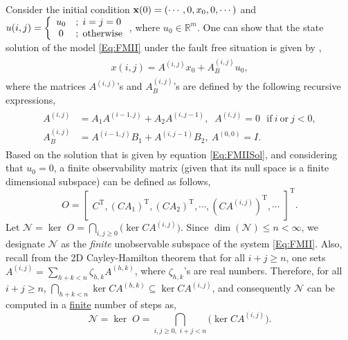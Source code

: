 \documentclass[journal,12pt,draftcls,onecolumn]{IEEEtran}
\newcommand{\tran}{\mathrm{T}}
\newcommand{\ssp}[1]{\mathscr{#1}}      \newcommand{\setssp}[1]{\mathfrak{#1}}   \newcommand{\fld}[1]{\mathbb{#1}}       \newcommand{\op}[1]{\mathcal{#1}}       \newcommand{\sumbanach}[1]{\sum{#1}}
\begin{document}
Consider the initial condition ${\bf x}(0) = (\cdots,0,x_0,0,\cdots)$ and $u(i,j) = \left\{
\begin{array} {c l}
u_0 &;\; i=j=0\\
0 &;\; \mathrm{otherwise}
\end{array}\right.$, where $u_0\in\fld{R}^m$. One can show that the  state solution of the model \eqref{Eq:FMII} under the fault free situation is given by \cite{FMinBook},
\vspace{-1mm}
\begin{eqnarray}\label{Eq:FMIISol}
	\begin{split}
		x(i,j) = A^{(i,j)}x_0 + A^{(i,j)}_B u_0,
	\end{split}
\end{eqnarray}
where the matrices $A^{(i,j)}$'s and $A^{(i,j)}_B$'s are defined by the following recursive  expressions,
\vspace{-2mm}
\begin{eqnarray}\label{Eq: Adef1}
	\begin{split}
		A^{(i,j)} &= A_1 A^{(i-1,j)} + A_2A^{(i,j-1)},\;\; A^{(i,j)} = 0 \ \ \  \mathrm{if} \ i \ \mathrm{or} \ j < 0,\\
		A^{(i,j)}_B &=A^{(i-1,j)}B_1+A^{(i,j-1)}B_2,\ A^{(0,0)} = I.
	\end{split}
\end{eqnarray}
Based on the solution that is given by equation  \eqref{Eq:FMIISol}, and considering that $u_0=0$, a finite observability matrix (given that its null space is a finite dimensional subspace) can be defined as follows,
\begin{equation}\label{Eq:Observ_M}
	O = \begin{bmatrix}C^\tran, (CA_1)^\tran, (CA_2)^\tran, \cdots, (CA^{(i,j)})^\tran, \cdots\end{bmatrix}^\tran.
\end{equation}
Let $\ssp{N} = \ker\;O = \bigcap_{i,j\geq 0} \big(\ker CA^{(i,j)}\big)$. Since $\dim(\ssp{N})\le n<\infty$, we designate $\ssp{N}$ as the \emph{finite} unobservable subspace of the system \eqref{Eq:FMII}.  Also, recall from the 2D Cayley-Hamilton theorem \cite{FMinBook} that for all $i+j\geq n$, one sets $A^{(i,j)}=\sum_{h+k<n}\zeta_{h,k} A^{(h,k)}$, where $\zeta_{h,k}$'s are real numbers. Therefore, for all $i+j\geq n$, $\bigcap_{h+k<n}\ker CA^{(h,k)}\subseteq\ker CA^{(i,j)}$, and consequently $\ssp{N}$ can be computed in a \underline{finite} number of steps as,
\begin{equation}\label{Eq:UnObsSpaceFinite}
	\ssp{N} = \ker\;O = \bigcap_{i,j\geq 0,\;i+j<n} \big(\ker CA^{(i,j)}\big).
\end{equation}
\end{document}
